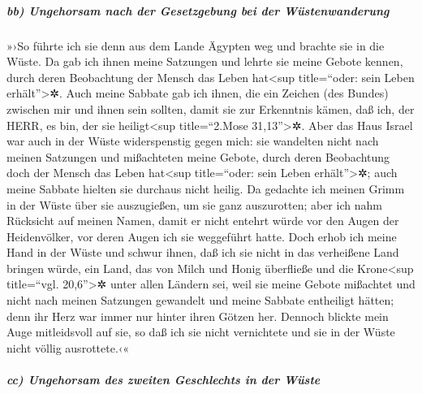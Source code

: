 \hypertarget{bb-ungehorsam-nach-der-gesetzgebung-bei-der-wuxfcstenwanderung}{%
\subparagraph{bb) Ungehorsam nach der Gesetzgebung bei der
Wüstenwanderung}\label{bb-ungehorsam-nach-der-gesetzgebung-bei-der-wuxfcstenwanderung}}

»›So führte ich sie denn aus dem Lande Ägypten weg und
brachte sie in die Wüste. Da gab ich ihnen meine
Satzungen und lehrte sie meine Gebote kennen, durch deren Beobachtung
der Mensch das Leben hat\textless sup title=``oder: sein Leben
erhält''\textgreater✲. Auch meine Sabbate gab ich ihnen,
die ein Zeichen (des Bundes) zwischen mir und ihnen sein sollten, damit
sie zur Erkenntnis kämen, daß ich, der HERR, es bin, der sie
heiligt\textless sup title=``2.Mose 31,13''\textgreater✲.
Aber das Haus Israel war auch in der Wüste widerspenstig
gegen mich: sie wandelten nicht nach meinen Satzungen und mißachteten
meine Gebote, durch deren Beobachtung doch der Mensch das Leben
hat\textless sup title=``oder: sein Leben erhält''\textgreater✲; auch
meine Sabbate hielten sie durchaus nicht heilig. Da gedachte ich meinen
Grimm in der Wüste über sie auszugießen, um sie ganz auszurotten;
aber ich nahm Rücksicht auf meinen Namen, damit er nicht
entehrt würde vor den Augen der Heidenvölker, vor deren Augen ich sie
weggeführt hatte. Doch erhob ich meine Hand in der Wüste
und schwur ihnen, daß ich sie nicht in das verheißene Land bringen
würde, ein Land, das von Milch und Honig überfließe und die
Krone\textless sup title=``vgl. 20,6''\textgreater✲ unter allen Ländern
sei, weil sie meine Gebote mißachtet und nicht nach
meinen Satzungen gewandelt und meine Sabbate entheiligt hätten; denn ihr
Herz war immer nur hinter ihren Götzen her. Dennoch
blickte mein Auge mitleidsvoll auf sie, so daß ich sie nicht vernichtete
und sie in der Wüste nicht völlig ausrottete.‹«

\hypertarget{cc-ungehorsam-des-zweiten-geschlechts-in-der-wuxfcste}{%
\subparagraph{cc) Ungehorsam des zweiten Geschlechts in der
Wüste}\label{cc-ungehorsam-des-zweiten-geschlechts-in-der-wuxfcste}}

